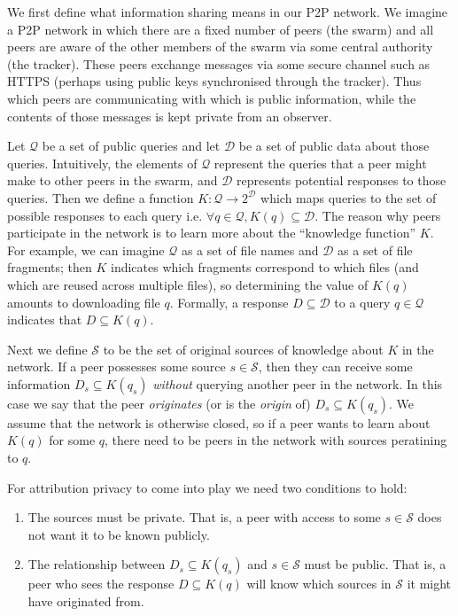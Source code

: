 \documentclass{article}
\begin{document}
We first define what information sharing means in our P2P network. We
imagine a P2P network in which there are a fixed number of peers (the
swarm) and all peers are aware of the other members of the swarm via some
central authority (the tracker). These peers exchange messages via some secure
channel such as HTTPS (perhaps using public keys synchronised through the
tracker). Thus which peers are communicating with which is public information,
while the contents of those messages is kept private from an observer.

Let $\mathcal{Q}$ be a set of public queries and let $\mathcal{D}$ be a set of
public data about those queries. Intuitively, the elements of $\mathcal{Q}$
represent the queries that a peer might make to other peers in the swarm, and
$\mathcal{D}$ represents potential responses to those queries. Then we define a
function $K:\mathcal{Q}\rightarrow 2^\mathcal{D}$ which maps queries to the set
of possible responses to each query i.e. $\forall q\in\mathcal{Q},
K(q)\subseteq\mathcal{D}$. The reason why peers participate in the network is to
learn more about the ``knowledge function'' $K$. For example, we can imagine
$\mathcal{Q}$ as a set of file names and $\mathcal{D}$ as a set of file
fragments; then $K$ indicates which fragments correspond to which files (and
which are reused across multiple files), so determining the value of $K(q)$
amounts to downloading file $q$. Formally, a response $D\subseteq\mathcal{D}$ to
a query $q\in\mathcal{Q}$ indicates that $D\subseteq K(q)$.

Next we define $\mathcal{S}$ to be the set of original sources of knowledge
about $K$ in the network. If a peer possesses some source $s\in\mathcal{S}$,
then they can receive some information $D_s\subseteq K(q_s)$ {\it without}
querying another peer in the network. In this case we say that the peer {\it
originates} (or is the {\it origin} of) $D_s\subseteq K(q_s)$. We assume that
the network is otherwise closed, so if a peer wants to learn about $K(q)$ for
some $q$, there need to be peers in the network with sources peratining to $q$.

For attribution privacy to come into play we need two conditions to hold:
\begin{enumerate}
	\item The sources must be private. That is, a peer with access to some
		$s\in\mathcal{S}$ does not want it to be known publicly.
	\item The relationship between $D_s\subseteq K(q_s)$ and $s\in\mathcal{S}$
		must be public. That is, a peer who sees the response $D\subseteq K(q)$
		will know which sources in $\mathcal{S}$ it might have originated from.
\end{enumerate}
\end{document}
